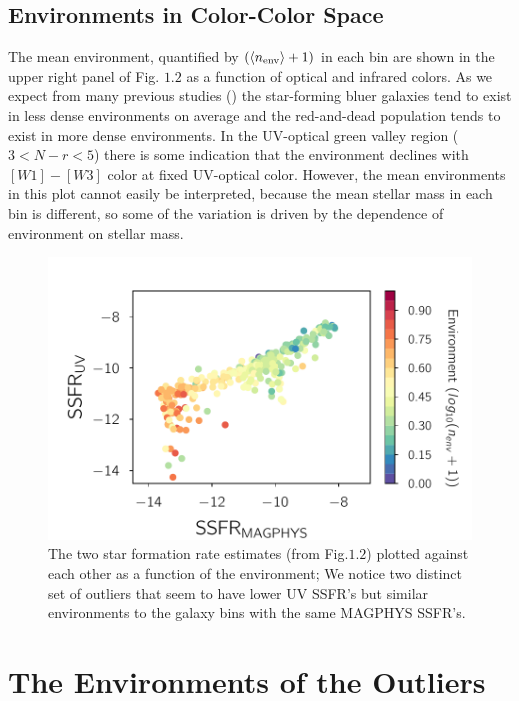 \subsection{Environments in Color-Color Space}

The mean environment, quantified by $(\langle n_{\rm env}\rangle + 1)$
in each bin are shown in the upper right panel of Fig. $1.2$ 
as a function of optical and infrared colors. As we expect from 
many previous studies (\citealt{blanton_physical_2009}) 
the star-forming bluer galaxies tend  to exist in less dense 
environments on average and the  red-and-dead population tends to 
exist in more dense environments.  In the UV-optical green valley 
region ($3 < N-r < 5$) there is some indication that the 
environment declines with $[W1]-[W3]$ color at fixed UV-optical 
color. However, the mean environments in this plot cannot easily 
be interpreted, because the mean stellar mass in each bin is 
different, so some of the variation is driven by the dependence 
of environment on stellar mass.

\begin{figure}
\includegraphics[width=\textwidth]{figures/2_env_plot.pdf}
\caption[Short figure name.]{The two star formation rate estimates (from Fig.$1.2$) plotted against each other as a function of the environment; We notice two distinct set of outliers that seem to have lower UV SSFR's but similar environments to the galaxy bins with the same MAGPHYS SSFR's.
\label{fig:myInlineFigure}}
\end{figure}

\section{The Environments of the Outliers}

